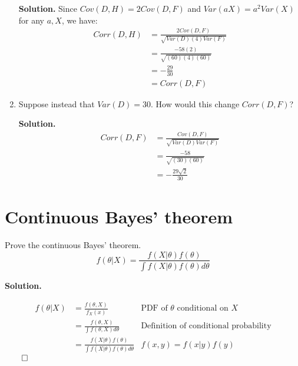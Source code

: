 \documentclass[12pt]{article}
\begin{document}
\begin{enumerate}
    \textbf{Solution.} Since $Cov(D,H)=2Cov(D,F)$ and $Var(aX)=a^2Var(X)$ for any $a,X$, we have:
    \begin{align*}
        Corr(D,H) &= \frac{2Cov(D,F)}{\sqrt{Var(D)(4)Var(F)}}
        \\ &= \frac{-58(2)}{\sqrt{(60)(4)(60)}}
        \\ &= -\frac{29}{30}
        \\ &= Corr(D,F)
    \end{align*}

    \item Suppose instead that $Var(D)=30$. How would this change $Corr(D,F)$?

    \textbf{Solution.}
    \begin{align*}
        Corr(D,F) &= \frac{Cov(D,F)}{\sqrt{Var(D)Var(F)}}
        \\ &= \frac{-58}{\sqrt{(30)(60)}}
        \\ &= -\frac{29\sqrt{2}}{30}
    \end{align*}
    
\end{enumerate}

\section{Continuous Bayes' theorem}
Prove the continuous Bayes' theorem.
\[ f(\theta | X) = \frac{f(X|\theta) f(\theta)}{\int f(X|\theta) f(\theta)d\theta}\]

\textbf{Solution.}

\begin{align*}
    f(\theta | X) &= \frac{f(\theta,X)}{f_X(x)} & \text{PDF of }\theta \text{ conditional on }X
    \\ &= \frac{f(\theta,X)}{\int f(\theta,X)d\theta} & \text{Definition of conditional probability}
    \\ &= \frac{f(X|\theta)f(\theta)}{\int f(X|\theta)f(\theta)d\theta} & f(x,y) = f(x|y)f(y)
\end{align*}
$\qed$
\end{document}

